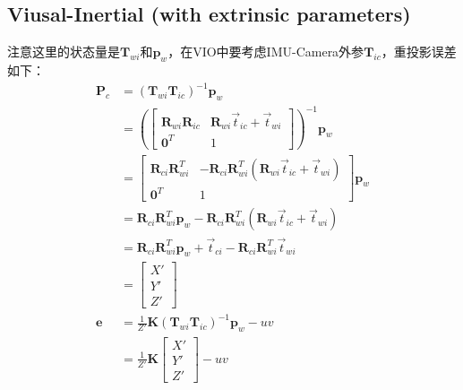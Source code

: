 \documentclass{article}
\begin{document}
\subsection{Viusal-Inertial (with extrinsic parameters)}\label{section:VIOPrj}
注意这里的状态量是$\boldsymbol{T}_{wi}$和$\boldsymbol{p}_w$，在VIO中要考虑IMU-Camera外参$\boldsymbol{T}_{ic}$，重投影误差如下：
\begin{equation}
	\begin{aligned}
		\boldsymbol{P}_c                         & =(\boldsymbol{T}_{wi}\boldsymbol{T}_{ic})^{-1}\boldsymbol{p}_w                                 \\&=
		\left(
		\left[
		\begin{matrix}
		\boldsymbol{R}_{wi}\boldsymbol{R}_{ic}   & \boldsymbol{R}_{wi}\vec{t}_{ic}+\vec{t}_{wi}                                                   \\
		\boldsymbol{0}^T                         & 1                                                                                              
		\end{matrix}
		\right]
		\right)^{-1}\boldsymbol{p}_w \\&=                              
		\left[
		\begin{matrix}
		\boldsymbol{R}_{ci}\boldsymbol{R}_{wi}^T & -\boldsymbol{R}_{ci}\boldsymbol{R}_{wi}^T(\boldsymbol{R}_{wi}\vec{t}_{ic}+\vec{t}_{wi})        \\
		\boldsymbol{0}^T                         & 1                                                                                              
		\end{matrix}
		\right]\boldsymbol{p}_w \\&=
		\boldsymbol{R}_{ci}\boldsymbol{R}_{wi}^T\boldsymbol{p}_w  -\boldsymbol{R}_{ci}\boldsymbol{R}_{wi}^T(\boldsymbol{R}_{wi}\vec{t}_{ic}+\vec{t}_{wi}) \\&=
		\boldsymbol{R}_{ci}\boldsymbol{R}_{wi}^T\boldsymbol{p}_w  +\vec{t}_{ci}-\boldsymbol{R}_{ci}\boldsymbol{R}_{wi}^T\vec{t}_{wi} \\&=
		\left[
		\begin{matrix}
		X'\\
		Y'\\                                         
		Z' 
		\end{matrix}
		\right] \\
		\boldsymbol {e}                          & =\frac{1}{Z'}\boldsymbol{K} (\boldsymbol{T}_{wi}\boldsymbol{T}_{ic})^{-1}\boldsymbol{p}_w  -uv \\&=
		\frac{1}{Z'}\boldsymbol{K} 
		\left[
		\begin{matrix}
		X'\\
		Y'\\                                         
		Z'
		\end{matrix}
		\right]-uv
	\end{aligned}
	\label{equation:reprj_err}
\end{equation}
\end{document}
